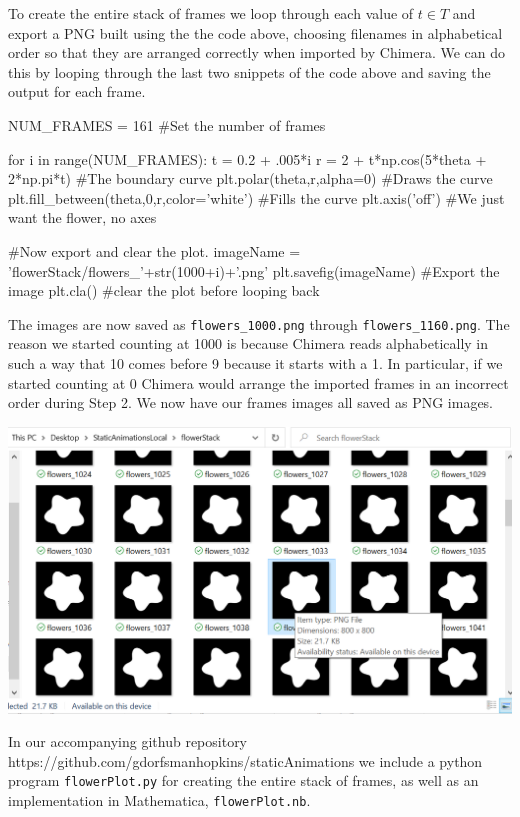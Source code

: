 \documentclass[12 pt]{article}
\begin{document}
To create the entire stack of frames we loop through each value of $t\in T$ and export a PNG built using the the code above, choosing filenames in alphabetical order so that they are arranged correctly when imported by Chimera.  We can do this by looping through the last two snippets of the code above and saving the output for each frame.
\begin{python}
NUM_FRAMES = 161 #Set the number of frames

for i in range(NUM_FRAMES):
  t = 0.2 + .005*i
  r = 2 + t*np.cos(5*theta + 2*np.pi*t) #The boundary curve
  plt.polar(theta,r,alpha=0) #Draws the curve
  plt.fill_between(theta,0,r,color='white') #Fills the curve
  plt.axis('off') #We just want the flower, no axes

  #Now export and clear the plot.
  imageName = 'flowerStack/flowers_'+str(1000+i)+'.png'
  plt.savefig(imageName) #Export the image
  plt.cla() #clear the plot before looping back
\end{python}
The images are now saved as \verb|flowers_1000.png| through \verb|flowers_1160.png|.  The reason we started counting at 1000 is because Chimera reads alphabetically in such a way that 10 comes before 9 because it starts with a 1.  In particular, if we started counting at 0 Chimera would arrange the imported frames in an incorrect order during Step 2.  We now have our frames images all saved as PNG images.
\begin{center}
    \includegraphics[width=.45\paperwidth]{images/list_of_files.png}
\end{center}
In our accompanying github repository https://github.com/gdorfsmanhopkins/staticAnimations we include a python program \verb|flowerPlot.py| for creating the entire stack of frames, as well as an implementation in Mathematica, \verb|flowerPlot.nb|.
\end{document}
